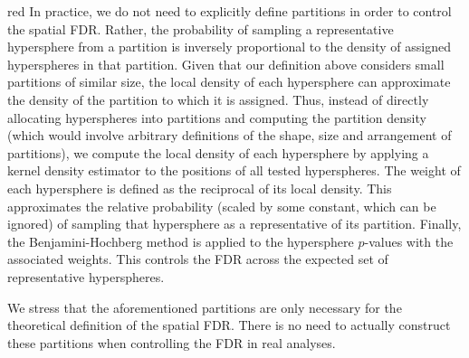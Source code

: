 \documentclass{article}
\begin{document}
\begin{color}{red}
In practice, we do not need to explicitly define partitions in order to control the spatial FDR.
Rather, the probability of sampling a representative hypersphere from a partition is inversely proportional to the density of assigned hyperspheres in that partition.
Given that our definition above considers small partitions of similar size, the local density of each hypersphere can approximate the density of the partition to which it is assigned.
Thus, instead of directly allocating hyperspheres into partitions and computing the partition density (which would involve arbitrary definitions of the shape, size and arrangement of partitions), we compute the local density of each hypersphere by applying a kernel density estimator to the positions of all tested hyperspheres.
The weight of each hypersphere is defined as the reciprocal of its local density.
This approximates the relative probability (scaled by some constant, which can be ignored) of sampling that hypersphere as a representative of its partition.
Finally, the Benjamini-Hochberg method is applied to the hypersphere $p$-values with the associated weights.
This controls the FDR across the expected set of representative hyperspheres.


We stress that the aforementioned partitions are only necessary for the theoretical definition of the spatial FDR.
There is no need to actually construct these partitions when controlling the FDR in real analyses.


\end{color}
\end{document}

